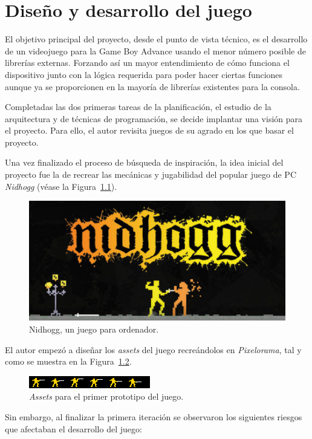 \chapter{Diseño y desarrollo del juego}\label{sec:desarrollo}

El objetivo principal del proyecto, desde el punto de vista técnico, es el desarrollo de un videojuego para la Game Boy Advance usando el menor número posible de librerías externas. Forzando así un mayor entendimiento de cómo funciona el dispositivo junto con la lógica requerida para poder hacer ciertas funciones aunque ya se proporcionen en la mayoría de librerías existentes para la consola.

Completadas las dos primeras tareas de la planificación, el estudio de la arquitectura y de técnicas de programación, se decide implantar una visión para el proyecto. Para ello, el autor revisita juegos de su agrado en los que basar el proyecto.

Una vez finalizado el proceso de búsqueda de inspiración, la idea inicial del proyecto fue la de recrear las mecánicas y jugabilidad del popular juego de PC \textit{Nidhogg} (véase la Figura~\ref{fig:nidhogg}).

\begin{figure}[h]
	\centering
	\includegraphics[width=.5\textwidth]{capitulos/capitulo5/nidhogg.jpg}
	\caption{Nidhogg, un juego para ordenador.}\label{fig:nidhogg}
\end{figure}
\FloatBarrier{}

El autor empezó a diseñar los \textit{assets} del juego recreándolos en \textit{Pixelorama}, tal y como se muestra en la Figura~\ref{fig:proto_1}.

\begin{figure}[h]
	\centering
	\includegraphics[width=.6\textwidth]{capitulos/capitulo5/proto_1.png}
	\caption{\textit{Assets} para el primer prototipo del juego.}\label{fig:proto_1}
\end{figure}
\FloatBarrier{}

Sin embargo, al finalizar la primera iteración se observaron los siguientes riesgos que afectaban el desarrollo del juego:


